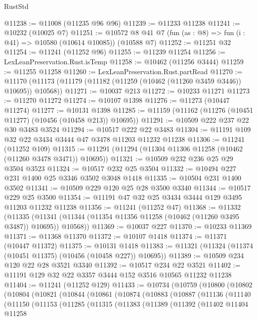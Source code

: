\begin{lexlean}{RustStd}
\begin{coremodule}
@11238 := @11008 (@11235 @96 @96)
@11239 := @11233 @11238
@11241 := @10232 (@10025 @7)
@11251 := @10572 @8 @41 @7 (fun (as : @8) => fun (i : @41) => @10580 (@10614 @10085)) (@10588 @7)
@11252 := @11251 @32
@11254 := @11241 (@11252 @96)
@11255 := @11239 @11254
@11256 := LexLeanPreservation.Rust.isTemp
@11258 := @10462 (@11256 @3444)
@11259 := @11255 @11258
@11260 := LexLeanPreservation.Rust.partRead
@11270 := @11170 (@11173 (@11179 (@11182 (@11259 (@10462 (@11260 @3459 @3446)) @10695)) @10568))
@11271 := @10037 @213
@11272 := @10233 @11271
@11273 := @11270 @11272
@11274 := @10107 @1398
@11276 := @11273 (@10447 @11274)
@11277 := @10131 @1398
@11285 := @11159 (@11162 (@11276 (@10451 @11277) (@10456 (@10458 @213)) @10695))
@11291 := @10509 @222 @237 @22 @30 @3483 @3524
@11294 := @10517 @222 @22 @3483
@11304 := @11191 @109 @32 @22 @3434 @3444 @47 @3478 @11203 @11232 @11238
@11306 := @11241 (@11252 @109)
@11315 := @11291 (@11294 (@11304 @11306 @11258 (@10462 (@11260 @3478 @3471)) @10695))
@11321 := @10509 @232 @236 @25 @29 @3504 @3523
@11324 := @10517 @232 @25 @3504
@11332 := @10494 @227 @231 @1400 @25 @3346 @3502 @3048 @1418
@11335 := @10504 @231 @1400 @3502
@11341 := @10509 @229 @120 @25 @28 @3500 @3340
@11344 := @10517 @229 @25 @3500
@11354 := @11191 @47 @32 @25 @3434 @3444 @129 @3495 @11203 @11232 @11238
@11356 := @11241 (@11252 @47)
@11368 := @11332
    (@11335 (@11341 (@11344 (@11354 @11356 @11258 (@10462 (@11260 @3495 @3487)) @10695)) @10568))
@11369 := @10037 @227
@11370 := @10233 @11369
@11371 := @11368 @11370
@11372 := @10107 @1418
@11374 := @11371 (@10447 @11372)
@11375 := @10131 @1418
@11383 := @11321 (@11324 (@11374 (@10451 @11375) (@10456 (@10458 @227)) @10695))
@11389 := @10509 @234 @120 @22 @28 @3521 @3340
@11392 := @10517 @234 @22 @3521
@11402 := @11191 @129 @32 @22 @3357 @3444 @152 @3516 @10565 @11232 @11238
@11404 := @11241 (@11252 @129)
@11433 := @10734
    (@10759
      (@10800
        (@10802
          (@10804
            (@10821
              (@10844
                (@10861
                  (@10874
                    (@10883
                      (@10887
                        (@11136
                          (@11140
                            (@11150
                              (@11153
                                (@11285
                                  (@11315
                                    (@11383
                                      (@11389
                                        (@11392
                                          (@11402
                                            @11404
                                            @11258

\end{coremodule}
\end{lexlean}
